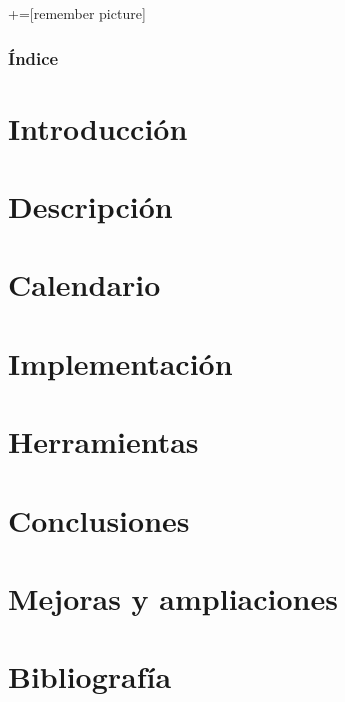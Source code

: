 \documentclass[9pt,xcolor=svgnames]{beamer}
\begin{document}
+=[remember picture]
\everymath{\displaystyle}

\begin{frame}
  \titlepage
\end{frame}

\normalsize

\begin{frame}
 \frametitle{Índice} 
 \tableofcontents
\end{frame}

\section{Introducción}


\section{Descripción}


\section{Calendario}


\section{Implementación}


\section{Herramientas}


\section{Conclusiones}


\section{Mejoras y ampliaciones}


\section{Bibliografía}


\end{document}
